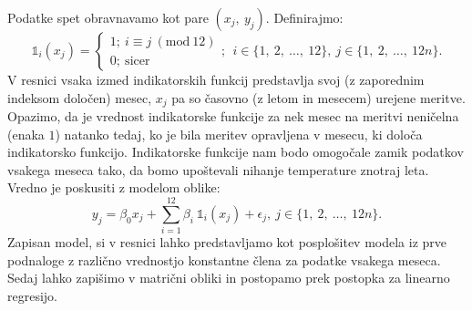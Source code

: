 \documentclass{article}
\begin{document}
Podatke spet obravnavamo kot pare $(x_j,~y_j)$. Definirajmo:
$$
\mathds{1}_i(x_j)= \begin{cases}
    1;~ i \equiv j~(\text{mod}~12) \\
    0;~\text{sicer}
\end{cases};~~i \in \{1,~2,~\dots,~12\},~j \in \{1,~2,~\dots,~12n\}.
$$
V resnici vsaka izmed indikatorskih funkcij predstavlja svoj (z zaporednim indeksom določen) mesec, $x_j$ pa so časovno (z letom in mesecem) urejene meritve. 
Opazimo, da je vrednost indikatorske funkcije za nek mesec na meritvi neničelna (enaka $1$) natanko tedaj, ko je bila meritev opravljena v mesecu, ki določa indikatorsko funkcijo.
Indikatorske funkcije nam bodo omogočale zamik podatkov vsakega meseca tako, da bomo upoštevali nihanje temperature znotraj leta. 
Vredno je poskusiti z modelom oblike:
$$
    y_j = \beta_0 x_j + \sum_{i=1}^{12}{\beta_{i}~\mathds{1}_i(x_j)} + \epsilon_j,~j \in \{1,~2,~\dots,~12n\}.
$$
Zapisan model, si v resnici lahko predstavljamo kot posplošitev modela iz prve podnaloge z različno vrednostjo konstantne člena za podatke vsakega meseca. 
Sedaj lahko zapišimo v  matrični obliki in postopamo prek postopka za linearno regresijo. 
\end{document}

